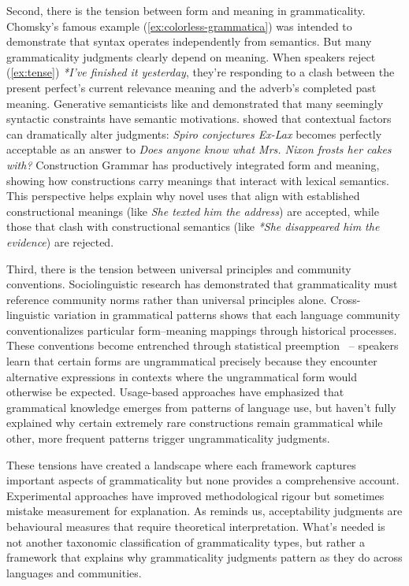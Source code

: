 \documentclass[12pt,letterpaper]{article}
\begin{document}
Second, there is the tension between form and meaning in grammaticality. Chomsky's famous example (\ref{ex:colorless-grammatica}) was intended to demonstrate that syntax operates independently from semantics. But many grammaticality judgments clearly depend on meaning. When speakers reject (\ref{ex:tense}) \textit{*I've finished it yesterday}, they're responding to a clash between the present perfect's current relevance meaning and the adverb's completed past meaning. Generative semanticists like \textcite{lakoff1971} and \textcite{mccawley1968} demonstrated that many seemingly syntactic constraints have semantic motivations. \textcite{morgan1973} showed that contextual factors can dramatically alter judgments: \textit{Spiro conjectures Ex-Lax} becomes perfectly acceptable as an answer to \textit{Does anyone know what Mrs. Nixon frosts her cakes with?} Construction Grammar \autocite{goldberg1995constructions} has productively integrated form and meaning, showing how constructions carry meanings that interact with lexical semantics. This perspective helps explain why novel uses that align with established constructional meanings (like \textit{She texted him the address}) are accepted, while those that clash with constructional semantics (like \textit{*She disappeared him the evidence}) are rejected.

Third, there is the tension between universal principles and community conventions. Sociolinguistic research \autocite{labov1972} has demonstrated that grammaticality must reference community norms rather than universal principles alone. Cross-linguistic variation in grammatical patterns shows that each language community conventionalizes particular form--meaning mappings through historical processes. These conventions become entrenched through statistical preemption \autocite{Goldberg2011}~-- speakers learn that certain forms are ungrammatical precisely because they encounter alternative expressions in contexts where the ungrammatical form would otherwise be expected. Usage-based approaches \autocite{bybee2006} have emphasized that grammatical knowledge emerges from patterns of language use, but haven't fully explained why certain extremely rare constructions remain grammatical while other, more frequent patterns trigger ungrammaticality judgments.

These tensions have created a landscape where each framework captures important aspects of grammaticality but none provides a comprehensive account. Experimental approaches have improved methodological rigour but sometimes mistake measurement for explanation. As \textcite{schutze2016} reminds us, acceptability judgments are behavioural measures that require theoretical interpretation. What's needed is not another taxonomic classification of grammaticality types, but rather a framework that explains why grammaticality judgments pattern as they do across languages and communities.
\end{document}
